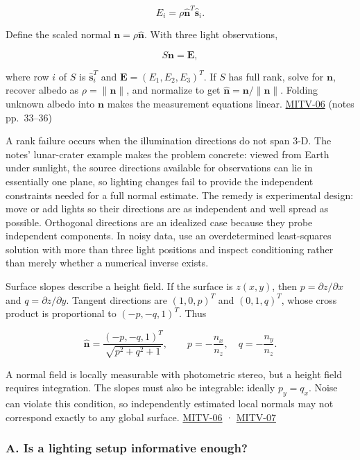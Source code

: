 \[
E_i=\rho\hat{\mathbf{n}}^T\hat{\mathbf{s}}_i.
\]

Define the scaled normal \(\mathbf{n}=\rho\hat{\mathbf{n}}\). With three light observations,

\[
S\mathbf{n}=\mathbf{E},
\]

where row \(i\) of \(S\) is \(\hat{\mathbf{s}}_i^T\) and \(\mathbf{E}=(E_1,E_2,E_3)^T\). If \(S\) has full rank, solve for \(\mathbf{n}\), recover albedo as \(\rho=\|\mathbf{n}\|\), and normalize to get \(\hat{\mathbf{n}}=\mathbf{n}/\|\mathbf{n}\|\). Folding unknown albedo into \(\mathbf{n}\) makes the measurement equations linear. \hyperref[04-visual-computing-ii-ch036]{MITV-06} (notes pp.~33--36)

A rank failure occurs when the illumination directions do not span 3-D. The notes' lunar-crater example makes the problem concrete: viewed from Earth under sunlight, the source directions available for observations can lie in essentially one plane, so lighting changes fail to provide the independent constraints needed for a full normal estimate. The remedy is experimental design: move or add lights so their directions are as independent and well spread as possible. Orthogonal directions are an idealized case because they probe independent components. In noisy data, use an overdetermined least-squares solution with more than three light positions and inspect conditioning rather than merely whether a numerical inverse exists.

Surface slopes describe a height field. If the surface is \(z(x,y)\), then \(p=\partial z/\partial x\) and \(q=\partial z/\partial y\). Tangent directions are \((1,0,p)^T\) and \((0,1,q)^T\), whose cross product is proportional to \((-p,-q,1)^T\). Thus

\[
\hat{\mathbf{n}}=\frac{(-p,-q,1)^T}{\sqrt{p^2+q^2+1}},\qquad p=-\frac{n_x}{n_z},\quad q=-\frac{n_y}{n_z}.
\]

A normal field is locally measurable with photometric stereo, but a height field requires integration. The slopes must also be integrable: ideally \(p_y=q_x\). Noise can violate this condition, so independently estimated local normals may not correspond exactly to any global surface. \hyperref[04-visual-computing-ii-ch036]{MITV-06} · \hyperref[04-visual-computing-ii-ch036]{MITV-07}

\subsubsection{A. Is a lighting setup informative enough?}\label{a.-is-a-lighting-setup-informative-enough}

